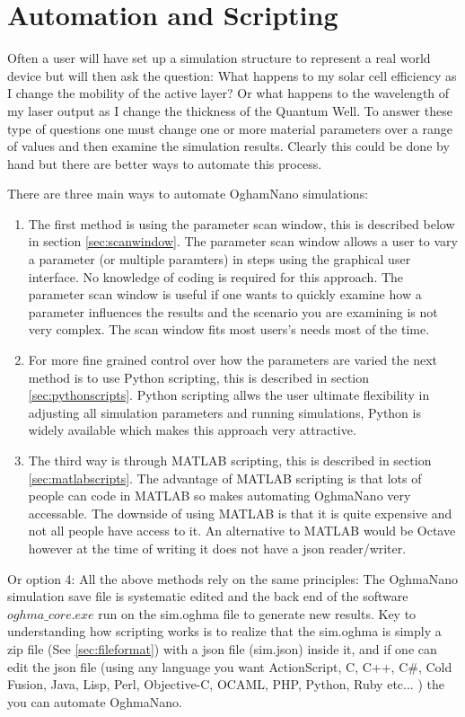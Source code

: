 \newpage
\chapter{Automation and Scripting}
Often a user will have set up a simulation structure to represent a real world device but will then ask the question: What happens to my solar cell efficiency as I change the mobility of the active layer? Or what happens to the wavelength of my laser output as I change the thickness of the Quantum Well. To answer these type of questions one must change one or more material parameters over a range of values and then examine the simulation results.  Clearly this could be done by hand but there are better ways to automate this process.

There are three main ways to automate OghamNano simulations:
\begin{enumerate}
  \item The first method is using the parameter scan window, this is described below in section \ref{sec:scanwindow}.  The parameter scan window allows a user to vary a parameter (or multiple paramters) in steps using the graphical user interface. No knowledge of coding is required for this approach.  The parameter scan window is useful if one wants to quickly examine how a parameter influences the results and the scenario you are examining is not very complex. The scan window fits most users's needs most of the time.
  \item For more fine grained control over how the parameters are varied the next method is to use Python scripting, this is described in section \ref{sec:pythonscripts}.  Python scripting allws the user ultimate flexibility in adjusting all simulation parameters and running simulations, Python is widely available which makes this approach very attractive. 
  \item The third way is through MATLAB scripting, this is described in section \ref{sec:matlabscripts}. The advantage of MATLAB scripting is that lots of people can code in MATLAB so makes automating OghmaNano very accessable. The downside of using MATLAB is that it is quite expensive and not all people have access to it. An alternative to MATLAB would be Octave however at the time of writing it does not have a json reader/writer.
\end{enumerate}

Or option 4: All the above methods rely on the same principles: The OghmaNano simulation save file is systematic edited and the back end of the software $oghma\_core.exe$ run on the sim.oghma file to generate new results. Key to understanding how scripting works is to realize that the sim.oghma is simply a zip file (See \ref{sec:fileformat}) with a json file (sim.json) inside it, and if one can edit the json file (using any language you want ActionScript, C, C++, C\#, Cold Fusion, Java, Lisp, Perl, Objective-C, OCAML, PHP, Python, Ruby etc... ) the you can automate OghmaNano.
\vfill

\pagebreak






